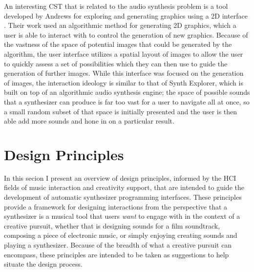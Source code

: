 An interesting CST that is related to the audio synthesis problem is a tool developed by Andrews for exploring and generating graphics using a 2D interface \cite{10.1145/3325480.3325506}. Their work used an algorithmic method for generating 2D graphics, which a user is able to interact with to control the generation of new graphics. Because of the vastness of the space of potential images that could be generated by the algorithm, the user interface utilizes a spatial layout of images to allow the user to quickly assess a set of possibilities which they can then use to guide the generation of further images. While this interface was focused on the generation of images, the interaction ideology is similar to that of Synth Explorer, which is built on top of an algorithmic audio synthesis engine; the space of possible sounds that a synthesizer can produce is far too vast for a user to navigate all at once, so a small random subset of that space is initially presented and the user is then able add more sounds and hone in on a particular result.

\section{Design Principles}
In this secion I present an overview of design principles, informed by the HCI fields of music interaction and creativity support, that are intended to guide the development of automatic synthesizer programming interfaces. These principles provide a framework for designing interactions from the perspective that a synthesizer is a musical tool that users \textit{want} to engage with in the context of a creative pursuit, whether that is designing sounds for a film soundtrack, composing a piece of electronic music, or simply enjoying creating sounds and playing a synthesizer. Because of the breadth of what a creative pursuit can encompass, these principles are intended to be taken as suggestions to help situate the design process.

